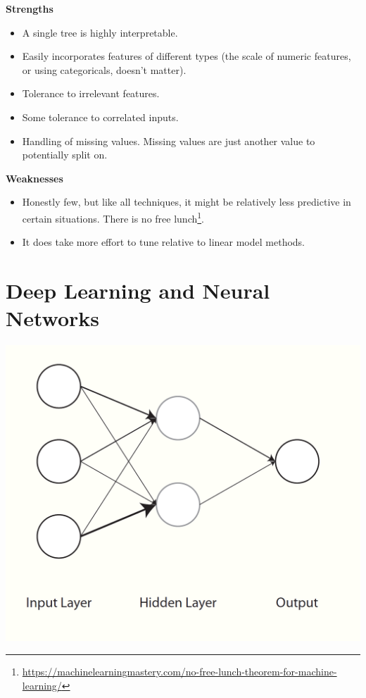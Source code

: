\documentclass[
  letterpaper,
]{krantz}
\providecommand{\tightlist}{%
  \setlength{\itemsep}{0pt}\setlength{\parskip}{0pt}}\usepackage{longtable,booktabs,array}
\DeclareRobustCommand{\href}[2]{#2\footnote{\url{#1}}}
\begin{document}
\textbf{Strengths}

\begin{itemize}
\tightlist
\item
  A single tree is highly interpretable.
\item
  Easily incorporates features of different types (the scale of numeric
  features, or using categoricals, doesn't matter).
\item
  Tolerance to irrelevant features.
\item
  Some tolerance to correlated inputs.
\item
  Handling of missing values. Missing values are just another value to
  potentially split on.
\end{itemize}

\textbf{Weaknesses}

\begin{itemize}
\tightlist
\item
  Honestly few, but like all techniques, it might be relatively less
  predictive in certain situations. There is
  \href{https://machinelearningmastery.com/no-free-lunch-theorem-for-machine-learning/}{no
  free lunch}.
\item
  It does take more effort to tune relative to linear model methods.
\end{itemize}

\section{Deep Learning and Neural
Networks}\label{deep-learning-and-neural-networks}

\includegraphics{img/nnet.png}
\end{document}
